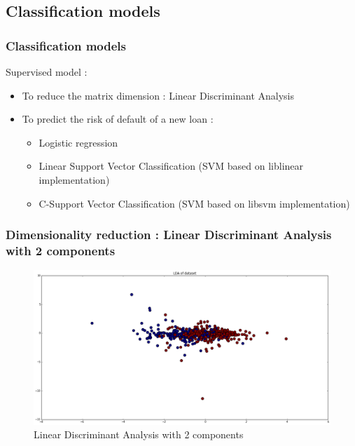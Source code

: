 \documentclass[10pt,handout,english]{beamer}
\begin{document}
		\subsection{Classification models}
		\begin{frame}
		\frametitle{Classification models}
			Supervised model :
			\begin{itemize}
				\item To reduce the matrix dimension : Linear Discriminant Analysis
				\item To predict the risk of default of a new loan :
				\begin{itemize}
					\item Logistic regression
					\item Linear Support Vector Classification (SVM based on liblinear implementation)
					\item C-Support Vector Classification (SVM based on libsvm implementation)
				\end{itemize}
			\end{itemize}
		\end{frame}

		\begin{frame}
		\frametitle{Dimensionality reduction : Linear Discriminant Analysis with 2 components}
			\begin{figure}[h!]
            	\centering
                \includegraphics[width=\textwidth]{lda.png}
                \caption{Linear Discriminant Analysis with 2 components}
			\end{figure}
		\end{frame}
\end{document}
